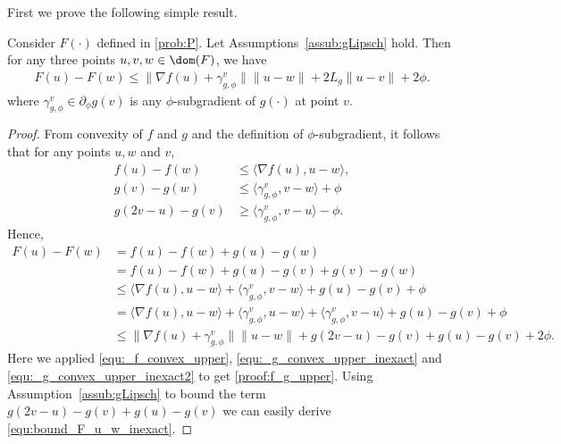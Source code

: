 \documentclass[11pt]{article}
\numberwithin{equation}{section}
\begin{document}
First we prove the following simple result.
\begin{lemma}
Consider $F(\cdot)$ defined in \eqref{prob:P}. Let Assumptions~\ref{assub:gLipsch} hold. Then for any three points $u, v, w \in \dom(F)$, we have
\begin{align}
	\label{equ:bound_F_u_w_inexact}
    F(u) - F(w) 
    \leq 
    \|\nabla f(u)+\gamma_{g, \phi}^v\|\|u-w\| + 2L_g \|u-v\| + 2\phi.
\end{align}
where $\gamma_{g, \phi}^v \in \partial_{\phi} g(v)$ is any $\phi$-subgradient of $g(\cdot)$ at point $v$.
\end{lemma}
\begin{proof}
	From convexity of $f$ and $g$ and the definition of $\phi$-subgradient, it follows that for any  points $u, w$ and $v$,
	\begin{align}
		\label{equ:_f_convex_upper}
	    f(u) - f(w) &\leq \langle \nabla f(u), u-w \rangle, \\
	    \label{equ:_g_convex_upper_inexact}
	    g(v) - g(w) &\leq \langle \gamma_{g, \phi}^v, v-w \rangle + \phi\\
	     \label{equ:_g_convex_upper_inexact2}
	    g(2v-u) - g(v) &\geq \langle \gamma_{g, \phi}^v, v-u \rangle- \phi.
	\end{align}
	Hence,
	\begin{align}
	    \nonumber
	    F(u)-F(w)
	    &=f(u)-f(w)+g(u)-g(w) \\
	    \nonumber
	    &=f(u)-f(w)+g(u)-g(v)+g(v)-g(w) \\
	    \label{proof:f_g_upper}
	    &\leq \langle \nabla f(u), u-w \rangle
	    +\langle \gamma_{g, \phi}^v, v-w \rangle 
	    +g(u)-g(v) 
	    + \phi\\
	    \nonumber
	    &= \langle \nabla f(u), u-w \rangle
	    +\langle \gamma_{g, \phi}^v, u-w \rangle 
	    +\langle \gamma_{g, \phi}^v, v-u \rangle 
	    +g(u)-g(v)
	    + \phi\\
	    \nonumber
	   & \leq \|\nabla f(u)+\gamma_{g, \phi}^v\|\|u-w\|  +
	  	    g(2v-u) - g(v)+g(u)-g(v) 
	    +2 \phi. 
	\end{align}
	Here  we applied \eqref{equ:_f_convex_upper}, \eqref{equ:_g_convex_upper_inexact} 
	and \eqref{equ:_g_convex_upper_inexact2} to get 
	 \eqref{proof:f_g_upper}. 
	Using 
	  Assumption~\ref{assub:gLipsch} to bound the term $g(2v-u) - g(v)+g(u)-g(v)$ 
	  we can easily derive \eqref{equ:bound_F_u_w_inexact}. 
\end{proof}
\end{document}
